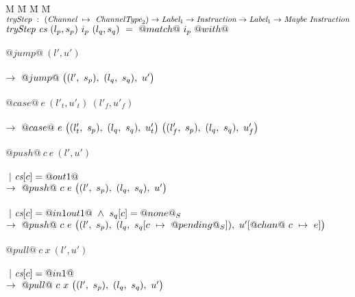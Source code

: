 

\begin{figure*}
\begin{tabbing}
M \= M \= M \= M \kill
$\ti{tryStep} ~:~ \ChanTypeMap \to \Label_1 \to \Instr \to \Label_1 \to \Maybe~\Instr$ \\
$\ti{tryStep} ~\cs~(l_p,s_p)~i_p~(l_q,s_q)~=~@match@~i_p~@with@$ \\

\\
\> $@jump@~(l',u')$ \\
\> \>  \\
\> \> $\to~@jump@~
      \nextStep
        {l'}{s_p}
        {l_q}{s_q}
        {u'}
      $ \\

\\


\> $@case@~e~(l'_t,u'_t)~(l'_f,u'_f)$ \\
\> \>  \\
\> \> $\to~@case@~e~
      \nextStep
        {l'_t}{s_p}
        {l_q}{s_q}
        {u'_t}
      ~
      \nextStep
        {l'_f}{s_p}
        {l_q}{s_q}
        {u'_f}
      $ \\

\\

\> $@push@~c~e~(l',u')$ \\
\> \> \\
\> \> $~|~\cs[c]=@out1@$ \\
\> \> $\to~@push@~c~e~
      \nextStep
        {l'}
          {s_p}
        {l_q}
          {s_q}
        {u'}
      $ \\

\> \> \\
\> \> $~|~\cs[c]=@in1out1@ ~\wedge~ s_q[c]=@none@_S$ \\
\> \> $\to~@push@~c~e~
      \nextStep
        {l'}
          {s_p}
        {l_q}
          {\HeapUpdateOne{c}{@pending@_S}{s_q}}
        {\HeapUpdateOne{@chan@~c}{e}{u'}}
      $ \\

\\

\> $@pull@~c~x~(l',u')$ \\
\> \> \\
\> \> $~|~\cs[c]=@in1@$ \\
\> \> $\to~@pull@~c~x~
      \nextStep
        {l'}{s_p}
        {l_q}{s_q}
        {u'}
    $ \\


\end{tabbing}
\end{figure*}
